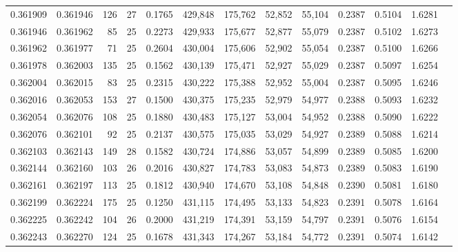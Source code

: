 \begin{tabular}{rrrrrrrrrrrrr}
0.361909 & 0.361946 &   126 &  27 &                                     0.1765 & 429,848 & 175,762 &  52,852 &  55,104 & 0.2387 & 0.5104 & 1.6281 \\
0.361946 & 0.361962 &    85 &  25 &                                     0.2273 & 429,933 & 175,677 &  52,877 &  55,079 & 0.2387 & 0.5102 & 1.6273 \\
0.361962 & 0.361977 &    71 &  25 &                                     0.2604 & 430,004 & 175,606 &  52,902 &  55,054 & 0.2387 & 0.5100 & 1.6266 \\
0.361978 & 0.362003 &   135 &  25 &                                     0.1562 & 430,139 & 175,471 &  52,927 &  55,029 & 0.2387 & 0.5097 & 1.6254 \\
0.362004 & 0.362015 &    83 &  25 &                                     0.2315 & 430,222 & 175,388 &  52,952 &  55,004 & 0.2387 & 0.5095 & 1.6246 \\
0.362016 & 0.362053 &   153 &  27 &                                     0.1500 & 430,375 & 175,235 &  52,979 &  54,977 & 0.2388 & 0.5093 & 1.6232 \\
0.362054 & 0.362076 &   108 &  25 &                                     0.1880 & 430,483 & 175,127 &  53,004 &  54,952 & 0.2388 & 0.5090 & 1.6222 \\
0.362076 & 0.362101 &    92 &  25 &                                     0.2137 & 430,575 & 175,035 &  53,029 &  54,927 & 0.2389 & 0.5088 & 1.6214 \\
0.362103 & 0.362143 &   149 &  28 &                                     0.1582 & 430,724 & 174,886 &  53,057 &  54,899 & 0.2389 & 0.5085 & 1.6200 \\
0.362144 & 0.362160 &   103 &  26 &                                     0.2016 & 430,827 & 174,783 &  53,083 &  54,873 & 0.2389 & 0.5083 & 1.6190 \\
0.362161 & 0.362197 &   113 &  25 &                                     0.1812 & 430,940 & 174,670 &  53,108 &  54,848 & 0.2390 & 0.5081 & 1.6180 \\
0.362199 & 0.362224 &   175 &  25 &                                     0.1250 & 431,115 & 174,495 &  53,133 &  54,823 & 0.2391 & 0.5078 & 1.6164 \\
0.362225 & 0.362242 &   104 &  26 &                                     0.2000 & 431,219 & 174,391 &  53,159 &  54,797 & 0.2391 & 0.5076 & 1.6154 \\
0.362243 & 0.362270 &   124 &  25 &                                     0.1678 & 431,343 & 174,267 &  53,184 &  54,772 & 0.2391 & 0.5074 & 1.6142 \\

\end{tabular}
